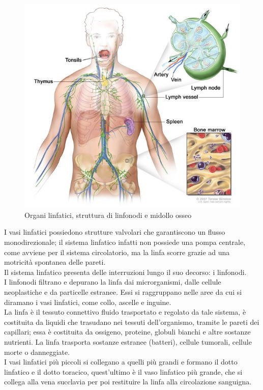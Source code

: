 \begin{figure}[H]
    \begin{center}
    \includegraphics[width=0.5\columnwidth]{img/anatomy.jpeg}
    \vspace{-3mm}
    \end{center}
    \caption{Organi linfatici, struttura di linfonodi e midollo osseo
    \cite{img2}}
    \label{fig:FIGURE_1.2}
\end{figure}

I vasi linfatici possiedono strutture valvolari che garantiscono un flusso monodirezionale; 
il sistema linfatico infatti non possiede una pompa centrale, 
come avviene per il sistema circolatorio, ma la linfa scorre grazie ad una motricità spontanea delle pareti.\\
Il sistema linfatico presenta delle interruzioni lungo il suo decorso: i linfonodi.\\ 
I linfonodi filtrano e depurano la linfa dai microrganismi, dalle cellule neoplastiche e 
da particelle estranee. Essi si raggruppano nelle aree da cui si diramano i vasi linfatici, 
come collo, ascelle e inguine.\\
La linfa è il tessuto connettivo fluido trasportato e regolato da tale sistema, è costituita 
da liquidi che trasudano nei tessuti dell'organismo, tramite le pareti dei capillari; essa è costituita 
da ossigeno, proteine, globuli bianchi e altre sostanze nutrienti. 
La linfa trasporta sostanze estranee (batteri), cellule tumorali, cellule morte o danneggiate.\\ 
I vasi linfatici più piccoli si collegano a quelli più grandi e formano il dotto linfatico e il dotto 
toracico, quest'ultimo è il vaso linfatico più grande, che si collega alla vena succlavia per poi restituire 
la linfa alla circolazione sanguigna\cite{BOOK1}. \\

